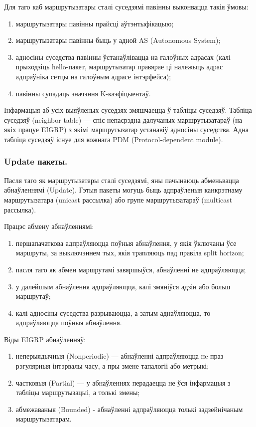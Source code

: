 Для таго каб маршрутызатары сталі суседзямі павінны выконвацца такія ўмовы:
\begin{enumerate}
    \item маршрутызатары павінны прайсці аўтэнтыфікацыю;
    \item маршрутызатары павінны быць у адной AS (Autonomous System);
    \item адносіны суседства павінны ўстанаўлівацца на галоўных адрасах (калі прыходзіць hello-пакет, маршрутызатар правярае ці належыць адрас адпраўніка сетцы на галоўным адрасе інтэрфейса);
    \item павінны супадаць значэння K-каэфіцыентаў.
\end{enumerate}

Інфармацыя аб усіх выяўленых суседзях змяшчаецца ў табліцы суседзяў.
Табліца суседзяў (neighbor table) --- спіс непасрэдна далучаных маршрутызатараў (на якіх працуе EIGRP) з якімі маршрутызатар устанавіў адносіны суседства. Адна табліца суседзяў існуе для кожнага PDM (Protocol-dependent module).

\subsubsection{Update пакеты.}

Пасля таго як маршрутызатары сталі суседзямі, яны пачынаюць абменьвацца абнаўленнямі (Update). Гэтыя пакеты могуць быць адпраўленыя канкрэтнаму маршрутызатара (unicast рассылка) або групе маршрутызатараў (multicast рассылка).

Працэс абмену абнаўленнямі:
\begin{enumerate}
    \item першапачаткова адпраўляюцца поўныя абнаўлення, у якія ўключаны ўсе маршруты, за выключэннем тых, якія трапляюць пад правіла split horizon;
    \item пасля таго як абмен маршрутамі завяршыўся, абнаўленні не адпраўляюцца;
    \item у далейшым абнаўлення адпраўляюцца, калі змяніўся адзін або больш маршрутаў;
    \item калі адносіны суседства разрываюцца, а затым аднаўляюцца, то адпраўляюцца поўныя абнаўлення.
\end{enumerate}

Віды EIGRP абнаўленняў:
\begin{enumerate}
    \item неперыядычныя (Nonperiodic) --- абнаўленні адпраўляюцца нe праз рэгулярныя інтэрвалы часу, а пры змене тапалогіі або метрыкі;
    \item частковыя (Partial) --- у абнаўленнях перадаецца не ўся інфармацыя з табліцы маршрутызацыі, а толькі змены;
    \item абмежаваныя (Bounded) - абнаўленні адпраўляюцца толькі задзейнічаным маршрутызатарам.
\end{enumerate}

